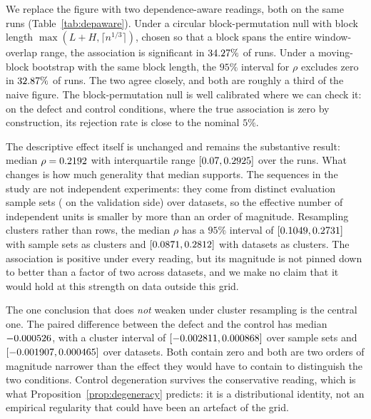 \documentclass[a4paper,fleqn]{cas-sc}
\begin{document}
We replace the figure with two dependence-aware readings, both on the same
\NumDepCells{} runs (Table~\ref{tab:depaware}). Under a circular block-permutation
null with block length $\max(L+H, \lceil n^{1/3}\rceil)$, chosen so that a block
spans the entire window-overlap range, the association is significant in
$34.27\%$ of runs. Under a moving-block bootstrap with the same block
length, the $95\%$ interval for $\rho$ excludes zero in
$32.87\%$ of runs. The two agree closely, and both are roughly a
third of the naive figure. The block-permutation null is well calibrated where we
can check it: on the defect and control conditions, where the true association is
zero by construction, its rejection rate is close to the nominal $5\%$.

The descriptive effect itself is unchanged and remains the substantive result:
median $\rho = 0.2192{}$ with interquartile range
$[0.07{}, 0.2925{}]$ over the \NumDepCells{} runs. What changes
is how much generality that median supports. The \NumDepSequences{} sequences in
the study are not \NumDepSequences{} independent experiments: they come from
\NumDepSampleSets{} distinct evaluation sample sets
(\NumDepSampleSetsVal{} on the validation side) over \NumDepDatasets{} datasets, so
the effective number of independent units is smaller by more than an order of
magnitude. Resampling clusters rather than rows, the median $\rho$ has a $95\%$
interval of $[0.1049{}, 0.2731{}]$ with
sample sets as clusters and $[0.0871{},
0.2812{}]$ with datasets as clusters. The association is
positive under every reading, but its magnitude is not pinned down to better than a
factor of two across datasets, and we make no claim that it would hold at this
strength on data outside this grid.

The one conclusion that does \emph{not} weaken under cluster resampling is the
central one. The paired difference between the defect and the control has median
$-0.000526{}$, with a cluster interval of
$[-0.002811{},
0.000868{}]$ over sample sets and
$[-0.001907{},
0.000465{}]$ over datasets. Both contain zero and
both are two orders of magnitude narrower than the effect they would have to
contain to distinguish the two conditions. Control degeneration survives the
conservative reading, which is what Proposition~\ref{prop:degeneracy} predicts:
it is a distributional identity, not an empirical regularity that could have been
an artefact of the grid.
\end{document}
